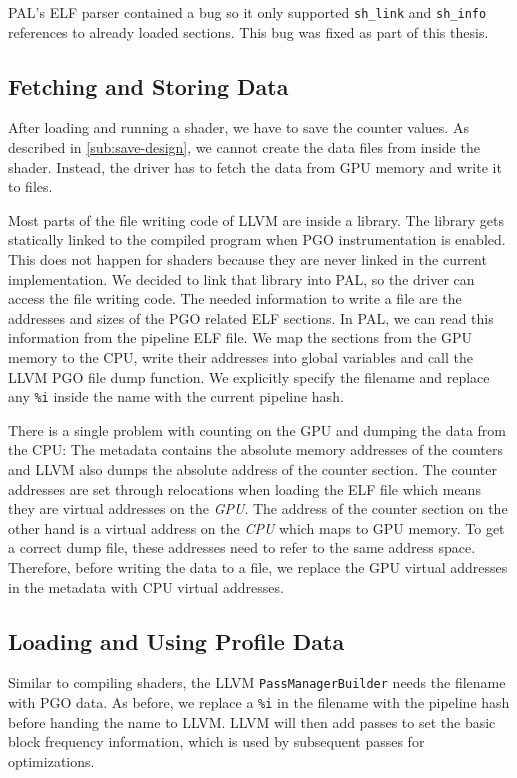 PAL's ELF parser contained a bug so it only supported \texttt{sh\_link} and \texttt{sh\_info} references to already loaded sections. This bug was fixed as part of this thesis.


\subsection{Fetching and Storing Data}
\label{sub:save}
After loading and running a shader, we have to save the counter values.
As described in \cref{sub:save-design}, we cannot create the data files from inside the shader.
Instead, the driver has to fetch the data from GPU memory and write it to files.

Most parts of the file writing code of LLVM are inside a library.
The library gets statically linked to the compiled program when PGO instrumentation is enabled.
This does not happen for shaders because they are never linked in the current implementation.
We decided to link that library into PAL, so the driver can access the file writing code.
The needed information to write a file are the addresses and sizes of the PGO related ELF sections.
In PAL, we can read this information from the pipeline ELF file. We map the sections from the GPU memory to the CPU, write their addresses into global variables and call the LLVM PGO file dump function.
We explicitly specify the filename and replace any \texttt{\%i} inside the name with the current pipeline hash.

There is a single problem with counting on the GPU and dumping the data from the CPU:
The metadata contains the absolute memory addresses of the counters and LLVM also dumps the absolute address of the counter section.
The counter addresses are set through relocations when loading the ELF file which means they are virtual addresses on the \emph{GPU}.
The address of the counter section on the other hand is a virtual address on the \emph{CPU} which maps to GPU memory. To get a correct dump file, these addresses need to refer to the same address space.
Therefore, before writing the data to a file, we replace the GPU virtual addresses in the metadata with CPU virtual addresses.

\subsection{Loading and Using Profile Data}
\label{sub:load}
Similar to compiling shaders, the LLVM \texttt{PassManagerBuilder} needs the filename with PGO data.
As before, we replace a \texttt{\%i} in the filename with the pipeline hash before handing the name to LLVM.
LLVM will then add passes to set the basic block frequency information, which is used by subsequent passes for optimizations.

